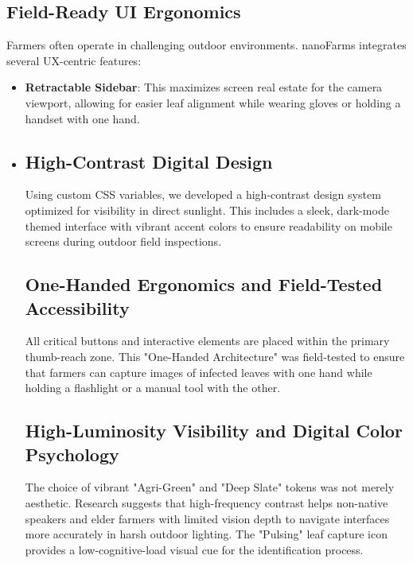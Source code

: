 \documentclass[11pt,onecolumn]{article}
\begin{document}
\subsection{Field-Ready UI Ergonomics}
Farmers often operate in challenging outdoor environments. nanoFarms integrates several UX-centric features:
\begin{itemize}
    \item \textbf{Retractable Sidebar}: This maximizes screen real estate for the camera viewport, allowing for easier leaf alignment while wearing gloves or holding a handset with one hand.
    \item \subsection{High-Contrast Digital Design}
Using custom CSS variables, we developed a high-contrast design system optimized for visibility in direct sunlight. This includes a sleek, dark-mode themed interface with vibrant accent colors to ensure readability on mobile screens during outdoor field inspections.

\subsection{One-Handed Ergonomics and Field-Tested Accessibility}
All critical buttons and interactive elements are placed within the primary thumb-reach zone. This "One-Handed Architecture" was field-tested to ensure that farmers can capture images of infected leaves with one hand while holding a flashlight or a manual tool with the other.

\subsection{High-Luminosity Visibility and Digital Color Psychology}
The choice of vibrant "Agri-Green" and "Deep Slate" tokens was not merely aesthetic. Research suggests that high-frequency contrast helps non-native speakers and elder farmers with limited vision depth to navigate interfaces more accurately in harsh outdoor lighting. The "Pulsing" leaf capture icon provides a low-cognitive-load visual cue for the identification process.
\end{itemize}
\end{document}
